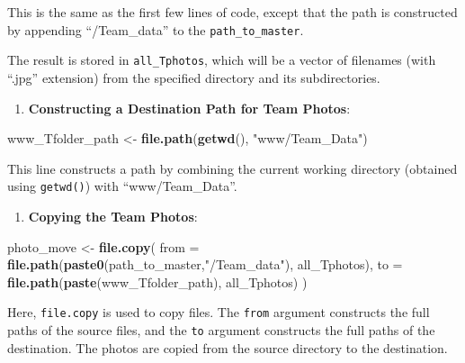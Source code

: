 \documentclass[
]{book}
\newenvironment{Shaded}{\begin{snugshade}}{\end{snugshade}}
\newcommand{\AttributeTok}[1]{\textcolor[rgb]{0.13,0.29,0.53}{#1}}
\newcommand{\FunctionTok}[1]{\textcolor[rgb]{0.13,0.29,0.53}{\textbf{#1}}}
\newcommand{\NormalTok}[1]{#1}
\newcommand{\OtherTok}[1]{\textcolor[rgb]{0.56,0.35,0.01}{#1}}
\newcommand{\StringTok}[1]{\textcolor[rgb]{0.31,0.60,0.02}{#1}}
\providecommand{\tightlist}{%
  \setlength{\itemsep}{0pt}\setlength{\parskip}{0pt}}
\theoremstyle{definition}
\theoremstyle{definition}
\theoremstyle{definition}
\theoremstyle{definition}
\theoremstyle{remark}
\begin{document}
This is the same as the first few lines of code, except that the path is constructed by appending ``/Team\_data'' to the \texttt{path\_to\_master}.

The result is stored in \texttt{all\_Tphotos}, which will be a vector of filenames (with ``.jpg'' extension) from the specified directory and its subdirectories.

\begin{enumerate}
\def\labelenumi{\arabic{enumi}.}
\setcounter{enumi}{1}
\tightlist
\item
  \textbf{Constructing a Destination Path for Team Photos}:
\end{enumerate}

\begin{Shaded}
\begin{Highlighting}[]
\NormalTok{   www\_Tfolder\_path }\OtherTok{\textless{}{-}} \FunctionTok{file.path}\NormalTok{(}\FunctionTok{getwd}\NormalTok{(), }\StringTok{"www/Team\_Data"}\NormalTok{)}
\end{Highlighting}
\end{Shaded}

This line constructs a path by combining the current working directory (obtained using \texttt{getwd()}) with ``www/Team\_Data''.

\begin{enumerate}
\def\labelenumi{\arabic{enumi}.}
\setcounter{enumi}{2}
\tightlist
\item
  \textbf{Copying the Team Photos}:
\end{enumerate}

\begin{Shaded}
\begin{Highlighting}[]
\NormalTok{   photo\_move }\OtherTok{\textless{}{-}} \FunctionTok{file.copy}\NormalTok{(}
     \AttributeTok{from =} \FunctionTok{file.path}\NormalTok{(}\FunctionTok{paste0}\NormalTok{(path\_to\_master,}\StringTok{"/Team\_data"}\NormalTok{), all\_Tphotos),}
     \AttributeTok{to =} \FunctionTok{file.path}\NormalTok{(}\FunctionTok{paste}\NormalTok{(www\_Tfolder\_path), all\_Tphotos)}
\NormalTok{   )}
\end{Highlighting}
\end{Shaded}

Here, \texttt{file.copy} is used to copy files. The \texttt{from} argument constructs the full paths of the source files, and the \texttt{to} argument constructs the full paths of the destination. The photos are copied from the source directory to the destination.
\end{document}
